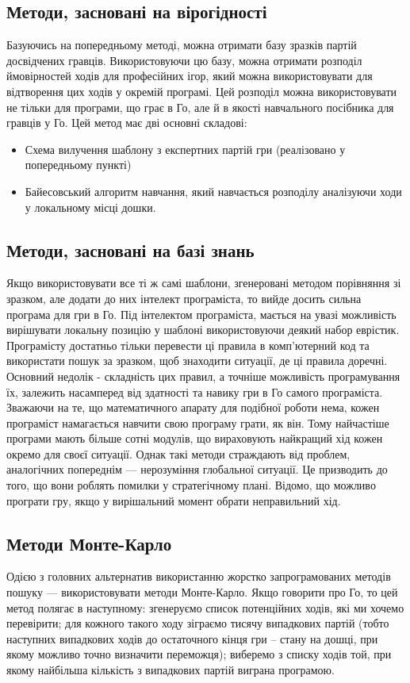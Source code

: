 \subsection{Методи, засновані на вірогідності}
Базуючись на попередньому методі, можна отримати базу зразків партій досвідчених гравців. Використовуючи цю базу, можна отримати розподіл ймовірностей ходів для професійних ігор, який можна використовувати для відтворення цих ходів у окремій програмі. Цей розподіл можна використовувати не тільки для програми, що грає в Го, але й в якості навчального посібника для гравців у Го. Цей метод має дві основні складові:
\begin{itemize}
	\item Схема вилучення шаблону з експертних партій гри (реалізовано у попередньому пункті)
	\item Байесовський алгоритм навчання, який навчається розподілу аналізуючи ходи у локальному місці дошки.
\end{itemize}
\subsection{Методи, засновані на базі знань}
Якщо використовувати все ті ж самі шаблони, згенеровані методом порівняння зі зразком, але додати до них інтелект програміста, то вийде досить сильна програма для гри в Го. Під інтелектом програміста, мається на увазі можливість вирішувати локальну позицію у шаблоні використовуючи деякий набор еврістик. Програмісту достатньо тільки перевести ці правила в комп'ютерний код та використати пошук за зразком, щоб знаходити ситуації, де ці правила доречні. Основний недолік - складність цих правил, а точніше можливість програмування їх, залежить насамперед від здатності та навику гри в Го самого програміста. Зважаючи на те, що математичного апарату для подібної роботи нема, кожен програміст намагається навчити свою програму грати, як він. Тому найчастіше програми мають більше сотні модулів, що вираховують найкращий хід кожен окремо для своєї ситуації. Однак такі методи страждають від проблем, аналогічних попереднім --- нерозуміння глобальної ситуації. Це призводить до того, що вони роблять помилки у стратегічному плані. Відомо, що можливо програти гру, якщо у вирішальний момент обрати неправильний хід.
\subsection{Методи Монте-Карло}
Одією з головних альтернатив використанню жорстко запрограмованих методів пошуку --- використовувати методи Монте-Карло. Якщо говорити про Го, то цей метод полягає в наступному:  згенеруємо список потенційних ходів, які ми хочемо перевірити; для кожного такого ходу зіграємо тисячу випадкових партій (тобто наступних випадкових ходів до остаточного кінця гри -- стану на дошці, при якому можливо точно визначити переможця); виберемо з списку ходів той, при якому найбільша кількість з випадкових партій виграна програмою.

